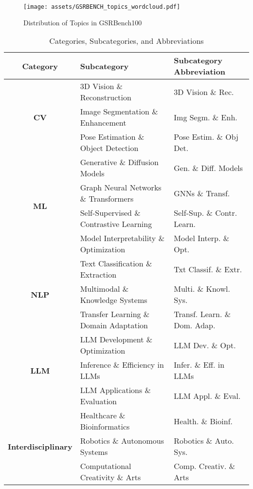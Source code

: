 \begin{figure*}[h]
    \centering
    \texttt{[image: assets/GSRBENCH\_topics\_wordcloud.pdf]}
    \caption{Distribution of Topics in GSRBench100}
    \label{fig:topics_distribution}
\end{figure*}

\begin{table*}[ht]
\small
\centering
\caption{Categories, Subcategories, and Abbreviations}
\label{tab:categories_subcategories_abbreviations}
\begin{tabular}{cll}
\toprule
\textbf{Category} & \textbf{Subcategory} & \textbf{Subcategory Abbreviation} \\
\midrule
\multirow{3}{*}{\textbf{CV}} 
    & 3D Vision \& Reconstruction & 3D Vision \& Rec. \\
    & Image Segmentation \& Enhancement & Img Segm. \& Enh. \\
    & Pose Estimation \& Object Detection & Pose Estim. \& Obj Det. \\
\midrule
\multirow{4}{*}{\textbf{ML}} 
    & Generative \& Diffusion Models & Gen. \& Diff. Models \\
    & Graph Neural Networks \& Transformers & GNNs \& Transf. \\
    & Self-Supervised \& Contrastive Learning & Self-Sup. \& Contr. Learn. \\
    & Model Interpretability \& Optimization & Model Interp. \& Opt. \\
\midrule
\multirow{3}{*}{\textbf{NLP}} 
    & Text Classification \& Extraction & Txt Classif. \& Extr. \\
    & Multimodal \& Knowledge Systems & Multi. \& Knowl. Sys. \\
    & Transfer Learning \& Domain Adaptation & Transf. Learn. \& Dom. Adap. \\
\midrule
\multirow{3}{*}{\textbf{LLM}} 
    & LLM Development \& Optimization & LLM Dev. \& Opt. \\
    & Inference \& Efficiency in LLMs & Infer. \& Eff. in LLMs \\
    & LLM Applications \& Evaluation & LLM Appl. \& Eval. \\
\midrule
\multirow{3}{*}{\textbf{Interdisciplinary}} 
    & Healthcare \& Bioinformatics & Health. \& Bioinf. \\
    & Robotics \& Autonomous Systems & Robotics \& Auto. Sys. \\
    & Computational Creativity \& Arts & Comp. Creativ. \& Arts \\
\bottomrule
\end{tabular}
\end{table*}

